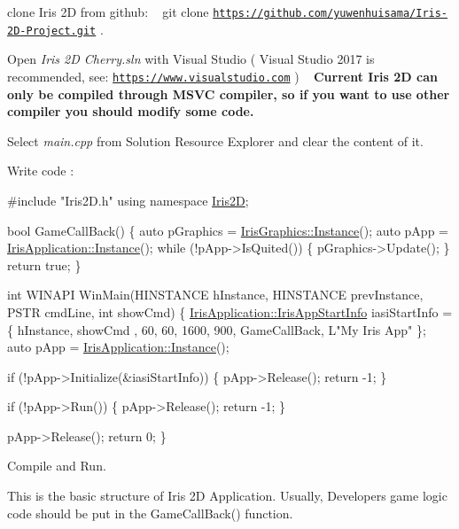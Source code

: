 \begin{DoxyItemize}
\item clone Iris 2D from github\+: ~\newline
 {\ttfamily  git clone \href{https://github.com/yuwenhuisama/Iris-2D-Project.git}{\tt https\+://github.\+com/yuwenhuisama/\+Iris-\/2\+D-\/\+Project.\+git} }. \item Open {\itshape  Iris 2D Cherry.\+sln } with Visual Studio ( Visual Studio 2017 is recommended, see\+: \href{https://www.visualstudio.com}{\tt https\+://www.\+visualstudio.\+com} ) ~\newline
 {\bfseries  Current Iris 2D can only be compiled through M\+S\+VC compiler, so if you want to use other compiler you should modify some code. } \item Select {\itshape  main.\+cpp } from {\ttfamily  Solution Resource Explorer } and clear the content of it. \item Write code \+: 
\begin{DoxyCode}
\textcolor{preprocessor}{#include "Iris2D.h"}
\textcolor{keyword}{using namespace }\hyperlink{namespace_iris2_d}{Iris2D};

\textcolor{keywordtype}{bool} GameCallBack() \{
    \textcolor{keyword}{auto} pGraphics = \hyperlink{class_iris2_d_1_1_iris_graphics_a25533fd69478336d60c5b1f639802d3a}{IrisGraphics::Instance}();
    \textcolor{keyword}{auto} pApp = \hyperlink{class_iris2_d_1_1_iris_application_ab2a9826c10d90732f398859782817f8e}{IrisApplication::Instance}();
    \textcolor{keywordflow}{while} (!pApp->IsQuited()) \{
      pGraphics->Update();
    \}
    \textcolor{keywordflow}{return} \textcolor{keyword}{true};
\}

\textcolor{keywordtype}{int} WINAPI WinMain(HINSTANCE hInstance, HINSTANCE prevInstance, PSTR cmdLine, \textcolor{keywordtype}{int} showCmd) \{
    \hyperlink{struct_iris2_d_1_1_iris_application_1_1_iris_app_start_info}{IrisApplication::IrisAppStartInfo} iasiStartInfo = \{ hInstance, showCmd
      , 60, 60, 1600, 900, GameCallBack, L\textcolor{stringliteral}{"My Iris App"} \};
    \textcolor{keyword}{auto} pApp = \hyperlink{class_iris2_d_1_1_iris_application_ab2a9826c10d90732f398859782817f8e}{IrisApplication::Instance}(); 

    \textcolor{keywordflow}{if} (!pApp->Initialize(&iasiStartInfo)) \{
      pApp->Release();
      \textcolor{keywordflow}{return} -1;
      \}

    \textcolor{keywordflow}{if} (!pApp->Run()) \{
      pApp->Release();
      \textcolor{keywordflow}{return} -1;
    \}

    pApp->Release();
    \textcolor{keywordflow}{return} 0;
\}
\end{DoxyCode}
 \item Compile and Run.\end{DoxyItemize}
This is the basic structure of Iris 2D Application. Usually, Developers\textquotesingle{} game logic code should be put in the Game\+Call\+Back() function.

